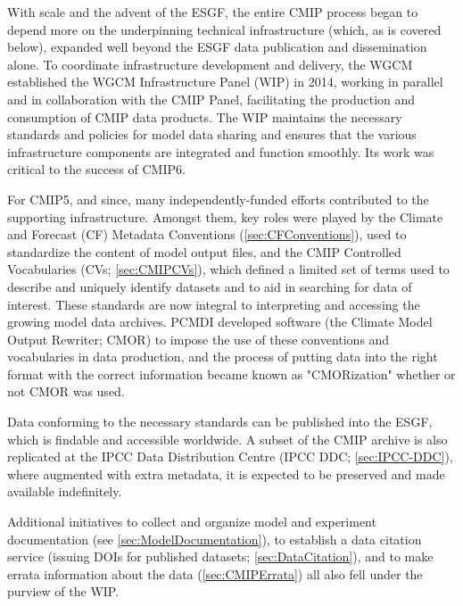 \documentclass[manuscript]{copernicus}
\def\cred#1{{\color{red}#1}}
\begin{document}
With scale and the advent of the ESGF, the entire CMIP process began to depend more on the underpinning technical infrastructure (which, as is covered below), expanded well beyond the ESGF data publication and dissemination alone. To coordinate infrastructure development and delivery, the WGCM established the WGCM Infrastructure Panel (WIP) in 2014, working in parallel and in collaboration with the CMIP Panel, facilitating the production and consumption of CMIP data products. The WIP maintains the necessary standards and policies for model data sharing and ensures that the various infrastructure components are integrated and function smoothly. Its work was critical to the success of CMIP6.

For CMIP5, and since, many independently-funded efforts contributed to the supporting infrastructure. Amongst them, key roles were played by the Climate and Forecast (CF) Metadata Conventions (\autoref{sec:CFConventions}), used to standardize the content of model output files, and the CMIP Controlled Vocabularies (CVs; \autoref{sec:CMIPCVs}), which defined a limited set of terms used to describe and uniquely identify datasets and to aid in searching for data of interest. These standards are now integral to interpreting and accessing the growing model data archives. PCMDI developed software (the Climate Model Output Rewriter; CMOR) to impose the use of these conventions and vocabularies in data production, and the process of putting data into the right format with the correct information became known as "CMORization" whether or not CMOR was used. 

Data conforming to the necessary standards can be published into the ESGF, which is findable and accessible worldwide. A subset of the CMIP archive is also replicated at the IPCC Data Distribution Centre (IPCC DDC; \autoref{sec:IPCC-DDC}), where augmented with extra metadata, it is expected to be preserved and made available indefinitely. 

Additional initiatives to collect and organize model and experiment documentation (see \autoref{sec:ModelDocumentation}), to establish a data citation service (issuing DOIs for published datasets; \autoref{sec:DataCitation}), and to make errata information about the data (\autoref{sec:CMIPErrata}) all also fell under the purview of the WIP.

\end{document}
